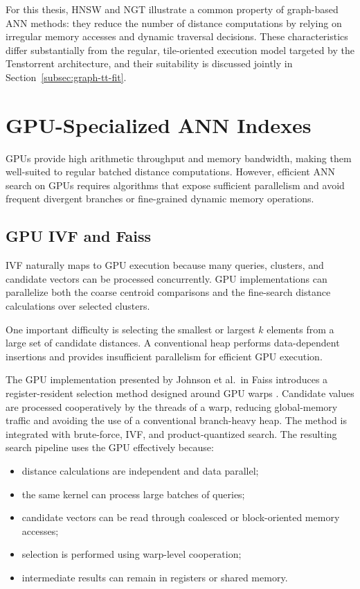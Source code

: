 For this thesis, HNSW and NGT illustrate a common property of graph-based ANN methods: they reduce the number of distance computations by relying on irregular memory accesses and dynamic traversal decisions. These characteristics differ substantially from the regular, tile-oriented execution model targeted by the Tenstorrent architecture, and their suitability is discussed jointly in Section~\ref{subsec:graph-tt-fit}.

\section{GPU-Specialized ANN Indexes}
\label{sec:gpu-indexes}

GPUs provide high arithmetic throughput and memory bandwidth, making them well-suited to regular batched distance computations. However, efficient ANN search on GPUs requires algorithms that expose sufficient parallelism and avoid frequent divergent branches or fine-grained dynamic memory operations.

\subsection{GPU IVF and Faiss}
\label{subsec:gpu-faiss}

IVF naturally maps to GPU execution because many queries, clusters, and candidate vectors can be processed concurrently. GPU implementations can parallelize both the coarse centroid comparisons and the fine-search distance calculations over selected clusters.

One important difficulty is selecting the smallest or largest \(k\) elements from a large set of candidate distances. A conventional heap performs data-dependent insertions and provides insufficient parallelism for efficient GPU execution.

The GPU implementation presented by Johnson et al.\ in Faiss introduces a register-resident selection method designed around GPU warps \cite{faiss}. Candidate values are processed cooperatively by the threads of a warp, reducing global-memory traffic and avoiding the use of a conventional branch-heavy heap. The method is integrated with brute-force, IVF, and product-quantized search.
\newline
The resulting search pipeline uses the GPU effectively because:
\begin{itemize}
\item distance calculations are independent and data parallel;
\item the same kernel can process large batches of queries;
\item candidate vectors can be read through coalesced or block-oriented memory accesses;
\item selection is performed using warp-level cooperation;
\item intermediate results can remain in registers or shared memory.
\end{itemize}

